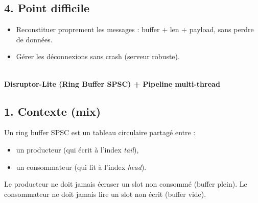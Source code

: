 \documentclass[11pt,a4paper]{article}
\newcommand{\Part}[2]{%
  \vspace{1.0em}
  \noindent{\large\textbf{Part #1}}\\
  \textbf{#2}\\
  \vspace{0.5em}
}
\begin{document}
\subsection*{4. Point difficile}
\begin{itemize}
  \item Reconstituer proprement les messages : buffer + len + payload, sans perdre de données.
  \item Gérer les déconnexions sans crash (serveur robuste).
\end{itemize}

\Part{III}{Disruptor-Lite (Ring Buffer SPSC) + Pipeline multi-thread}

\subsection*{1. Contexte (mix)}
Un ring buffer SPSC est un tableau circulaire partagé entre :
\begin{itemize}
  \item un producteur (qui écrit à l’index \textit{tail}),
  \item un consommateur (qui lit à l’index \textit{head}).
\end{itemize}
Le producteur ne doit jamais écraser un slot non consommé (buffer plein).
Le consommateur ne doit jamais lire un slot non écrit (buffer vide).
\end{document}
